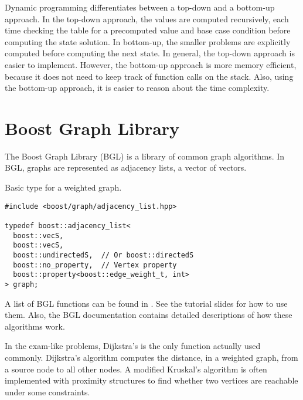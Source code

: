 \documentclass[justified,nobib]{tufte-handout}
\begin{document}

Dynamic programming differentiates between a top-down and a bottom-up approach.
In the top-down approach, the values are computed recursively, each time
checking the table for a precomputed value and base case condition before
computing the state solution. In bottom-up, the smaller problems are explicitly
computed before computing the next state. In general, the top-down approach is
easier to implement. However, the bottom-up approach is more memory efficient,
because it does not need to keep track of function calls on the stack. Also,
using the bottom-up approach, it is easier to reason about the time complexity.

\section{Boost Graph Library}

The Boost Graph Library (BGL) is a library of common graph algorithms. In BGL,
graphs are represented as adjacency lists, \ie a vector of vectors.

\begin{listing}
    \caption{Basic type for a weighted graph.}
    \begin{lstlisting}
#include <boost/graph/adjacency_list.hpp>

typedef boost::adjacency_list<
  boost::vecS,
  boost::vecS,
  boost::undirectedS,  // Or boost::directedS
  boost::no_property,  // Vertex property
  boost::property<boost::edge_weight_t, int>
> graph;
  \end{lstlisting}
\end{listing}

A list of BGL functions can be found in . See the tutorial
slides for how to use them. Also, the BGL documentation contains detailed
descriptions of how these algorithms work.

In the exam-like problems, Dijkstra's is the only function actually used
commonly. Dijkstra's algorithm computes the distance, in a weighted graph, from
a source node to all other nodes. A modified Kruskal's algorithm is often
implemented with proximity structures to find whether two vertices are reachable
under some constraints.
\end{document}
